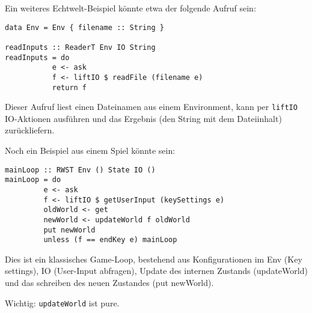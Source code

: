 \documentclass{beamer}
\begin{document}
\begin{frame}[fragile]
Ein weiteres Echtwelt-Beispiel könnte etwa der folgende Aufruf sein:
\begin{verbatim}
data Env = Env { filename :: String }

readInputs :: ReaderT Env IO String
readInputs = do
           e <- ask
           f <- liftIO $ readFile (filename e)
           return f
\end{verbatim}
\pause
Dieser Aufruf liest einen Dateinamen aus einem Environment, kann per \texttt{liftIO} IO-Aktionen ausführen und das Ergebnis (den String mit dem Dateiinhalt) zurückliefern.
\end{frame}

\begin{frame}[fragile]
Noch ein Beispiel aus einem Spiel könnte sein:
\begin{verbatim}
mainLoop :: RWST Env () State IO ()
mainLoop = do
         e <- ask
         f <- liftIO $ getUserInput (keySettings e)
         oldWorld <- get
         newWorld <- updateWorld f oldWorld
         put newWorld
         unless (f == endKey e) mainLoop
\end{verbatim}
\pause
Dies ist ein klassisches Game-Loop, bestehend aus Konfigurationen im Env (Key settings), IO (User-Input abfragen), Update des internen Zustands (updateWorld) und das schreiben des neuen Zustandes (put newWorld).\par
\pause
Wichtig: \texttt{updateWorld} ist pure.
\end{frame}
\end{document}
